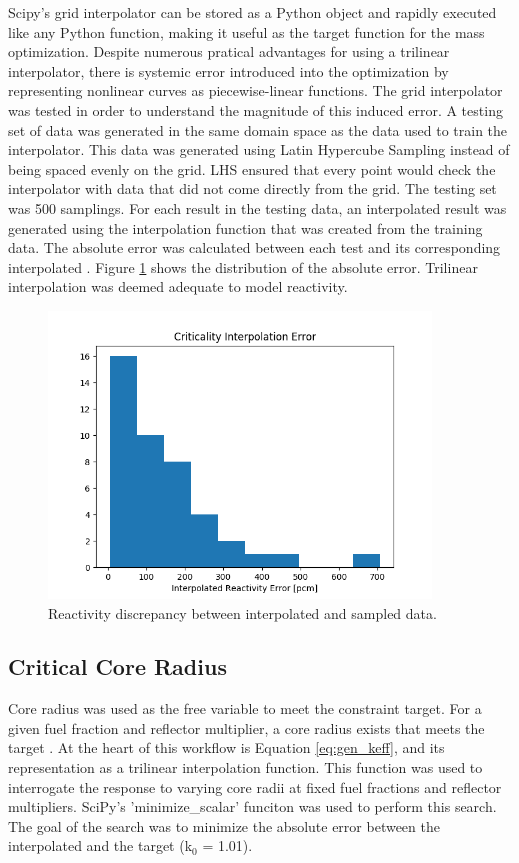 Scipy's grid interpolator can be stored as a Python object and rapidly executed like any
Python function, making it useful as the target function for the mass
optimization. Despite numerous pratical advantages for using a trilinear
interpolator, there is systemic error introduced into the optimization by
representing nonlinear curves as piecewise-linear functions. The grid
interpolator was tested in order to understand the magnitude of this induced
error. A testing set of data was generated in the same domain space as the data
used to train the interpolator. This data was generated using Latin Hypercube
Sampling instead of being spaced evenly on the grid. LHS ensured that every
point would check the interpolator with data that did not come directly from
the grid. The testing set was 500 \keff samplings. For each \keff result in the
testing data, an interpolated result was generated using the interpolation
function that was created from the training data. The absolute error was calculated
between each test \keff and its corresponding interpolated \keff. Figure
\ref{fig:interp_check} shows the distribution of the absolute error. Trilinear
interpolation was deemed adequate to model reactivity.

\begin{figure}[h]
    \centering
    \includegraphics[width=4in]{../images/check_interp.png}
\caption{Reactivity discrepancy between interpolated and sampled data.}
\label{fig:interp_check}
\end{figure}

\subsection{Critical Core Radius}
Core radius was used as the free variable to meet the \keff constraint target. For
a given fuel fraction and reflector multiplier, a core radius exists that meets
the target \keff. At the heart of this workflow is Equation \ref{eq:gen_keff},
and its representation as a trilinear interpolation function. This function was
used to interrogate the \keff response to varying core radii at fixed fuel
fractions and reflector multipliers. SciPy's 'minimize\_scalar' funciton was used to
perform this search. The goal of the search was to minimize the absolute error
between the interpolated \keff and the target \keff (k$_0$ = 1.01).


